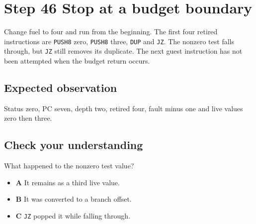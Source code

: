 \section{Step 46 Stop at a budget boundary}\label{vm-s46}

Change fuel to four and run from the beginning. The first four retired instructions are \texttt{PUSH8} zero, \texttt{PUSH8} three, \texttt{DUP} and \texttt{JZ}. The nonzero test falls through, but \texttt{JZ} still removes its duplicate. The next guest instruction has not been attempted when the budget return occurs.

\subsection{Expected observation}
Status zero, PC seven, depth two, retired four, fault minus one and live values zero then three.

\subsection{Check your understanding}
What happened to the nonzero test value?

\begin{itemize}
  \item \textbf{A} It remains as a third live value.
  \item \textbf{B} It was converted to a branch offset.
  \item \textbf{C} \texttt{JZ} popped it while falling through.
\end{itemize}
